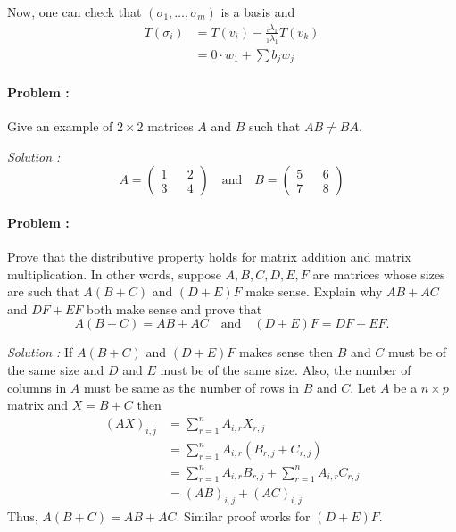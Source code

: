 Now, one can check that $(\sigma_1, \ldots,\sigma_m)$ is a basis and 
\begin{align*}
    T(\sigma_i) &= T(v_i) - \frac{{}_{i}\lambda_1}{{}_{1}\lambda_1} T(v_k) \\
    &= 0 \cdot w_1 + \sum b_j w_j
\end{align*}



\paragraph{Problem :}
Give an example of \(2 \times 2\) matrices \(A\) and \(B\) such that \(AB \neq BA\).

\vspace{4mm}
\textit{Solution :} 
\[ A = \begin{pmatrix}
    1 && 2 \\
    3 && 4
\end{pmatrix} \quad \text{and} \quad B = \begin{pmatrix}
    5 && 6 \\
    7 && 8
\end{pmatrix} \]

\paragraph{Problem :}
Prove that the distributive property holds for matrix addition and matrix multiplication. In other words, suppose \(A, B, C, D, E, F\) are 
matrices whose sizes are such that \(A(B + C)\) and \((D + E)F\) make sense. Explain why \(AB + AC\) and \(DF + EF\) both make sense and 
prove that
\[
A(B + C) = AB + AC 
\quad \text{and} \quad
(D + E)F = DF + EF.
\]

\vspace{4mm}
\textit{Solution :} If $A(B+C)$ and $(D+E)F$ makes sense then $B$ and $C$ must be of the same size and $D$ and $E$ must be of the same size.
Also, the number of columns in $A$ must be same as the number of rows in $B$ and $C$. Let $A$ be a $n \times p$ matrix and $X=B+C$ then 
\begin{align*}
    (AX)_{i,j} &= \sum_{r=1}^{n} A_{i,r}X_{r,j} \\
    &= \sum_{r=1}^{n} A_{i,r} (B_{r,j}+C_{r,j}) \\
    &= \sum_{r=1}^{n} A_{i,r} B_{r,j} + \sum_{r=1}^{n} A_{i,r} C_{r,j} \\
    &= (AB)_{i,j} + (AC)_{i,j} 
\end{align*}
Thus, $A(B+C)=AB+AC$. Similar proof works for $(D+E)F$.


